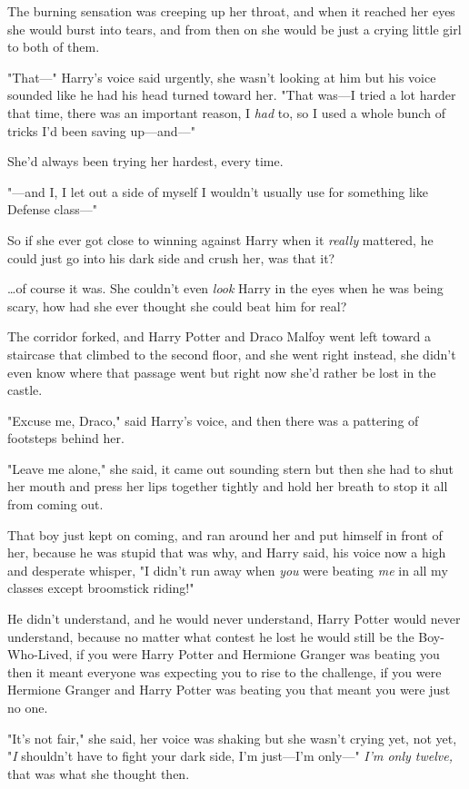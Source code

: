 The burning sensation was creeping up her throat, and when it reached her eyes 
she would burst into tears, and from then on she would be just a crying little 
girl to both of them.

"That---" Harry's voice said urgently, she wasn't looking at him but his voice 
sounded like he had his head turned toward her. "That was---I tried a lot 
harder that time, there was an important reason, I \emph{had} to, so I used a 
whole bunch of tricks I'd been saving up---and---"

She'd always been trying her hardest, every time.

"---and I, I let out a side of myself I wouldn't usually use for something like 
Defense class---"

So if she ever got close to winning against Harry when it \emph{really} 
mattered, he could just go into his dark side and crush her, was that it?

{\ldots}of course it was. She couldn't even \emph{look} Harry in the eyes when 
he was being scary, how had she ever thought she could beat him for real?

The corridor forked, and Harry Potter and Draco Malfoy went left toward a 
staircase that climbed to the second floor, and she went right instead, she 
didn't even know where that passage went but right now she'd rather be lost in 
the castle.

"Excuse me, Draco," said Harry's voice, and then there was a pattering of 
footsteps behind her.

"Leave me alone," she said, it came out sounding stern but then she had to shut 
her mouth and press her lips together tightly and hold her breath to stop it 
all from coming out.

That boy just kept on coming, and ran around her and put himself in front of 
her, because he was stupid that was why, and Harry said, his voice now a high 
and desperate whisper, "I didn't run away when \emph{you} were beating 
\emph{me} in all my classes except broomstick riding!"

He didn't understand, and he would never understand, Harry Potter would never 
understand, because no matter what contest he lost he would still be the 
Boy-Who-Lived, if you were Harry Potter and Hermione Granger was beating you 
then it meant everyone was expecting you to rise to the challenge, if you were 
Hermione Granger and Harry Potter was beating you that meant you were just no 
one.

"It's not fair," she said, her voice was shaking but she wasn't crying yet, not 
yet, "\emph{I} shouldn't have to fight your dark side, I'm just---I'm only---" 
\emph{I'm only twelve,} that was what she thought then.

